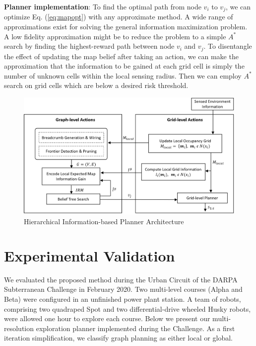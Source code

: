\documentclass{article}
\newcommand{\ph}[1]{{\textbf{#1}:}} %
\begin{document}
\ph{Planner implementation}
To find the optimal path from node $v_i$ to $v_j$, we can optimize Eq. (\ref{eq:mapopt}) with any approximate method.  A wide range of approximations exist for solving the general information maximization problem.  A low fidelity approximation might be to reduce the problem to a simple $A^*$ search by finding the highest-reward path between node $v_i$ and $v_j$.  To disentangle the effect of updating the map belief after taking an action, we can make the approximation that the information to be gained at each grid cell is simply the number of unknown cells within the local sensing radius.  Then we can employ $A^*$ search on grid cells which are below a desired risk threshold.

\begin{figure}[t!]
  \includegraphics[width=.48\textwidth]{figures/structure_v5.png}
  \centering
  \caption{Hierarchical Information-based Planner Architecture}
  \label{fig:architecture}
\end{figure}

\section{Experimental Validation}\label{sec:urban}
We evaluated the proposed method during the Urban Circuit of the DARPA Subterranean Challenge in February 2020. Two multi-level courses (Alpha and Beta) were configured in an unfinished power plant station. A team of robots, comprising two quadraped Spot and two differential-drive wheeled Husky robots, were allowed one hour to explore each course. Below we present our multi-resolution exploration planner implemented during the Challenge. As a first iteration simplification, we classify graph planning as either local or global. 
\end{document}
